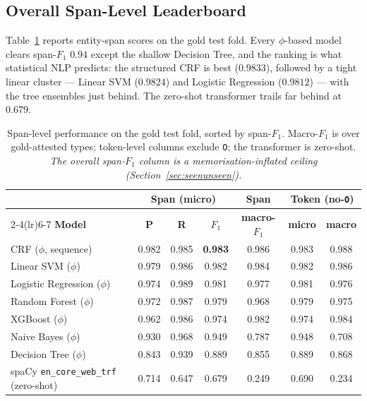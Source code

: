 \documentclass[conference]{IEEEtran}
\begin{document}
\subsection{Overall Span-Level Leaderboard}
\label{sec:overall}

Table~\ref{tab:leaderboard} reports entity-span scores on the gold test fold. Every $\phi$-based model clears span-$F_1$ $0.94$ except the shallow Decision Tree, and the ranking is what statistical NLP predicts: the structured CRF is best ($0.9833$), followed by a tight linear cluster --- Linear SVM ($0.9824$) and Logistic Regression ($0.9812$) --- with the tree ensembles just behind. The zero-shot transformer trails far behind at $0.679$.

\begin{table}[!t]
\centering
\caption{Span-level performance on the gold test fold, sorted by span-$F_1$. Macro-$F_1$ is over gold-attested types; token-level columns exclude \texttt{O}; the transformer is zero-shot. \emph{The overall span-$F_1$ column is a memorisation-inflated ceiling (Section~\ref{sec:seenunseen}).}}
\label{tab:leaderboard}
\small
\begin{tabular}{@{}l ccc c cc@{}}
\toprule
& \multicolumn{3}{c}{\textbf{Span (micro)}} & \textbf{Span} & \multicolumn{2}{c}{\textbf{Token (no-\texttt{O})}} \\
\cmidrule(lr){2-4}\cmidrule(lr){6-7}
\textbf{Model} & \textbf{P} & \textbf{R} & \textbf{$F_1$} & \textbf{macro-$F_1$} & \textbf{micro} & \textbf{macro} \\
\midrule
CRF ($\phi$, sequence)          & 0.982 & 0.985 & \textbf{0.983} & 0.986 & 0.983 & 0.988 \\
Linear SVM ($\phi$)             & 0.979 & 0.986 & 0.982 & 0.984 & 0.982 & 0.986 \\
Logistic Regression ($\phi$)    & 0.974 & 0.989 & 0.981 & 0.977 & 0.981 & 0.976 \\
Random Forest ($\phi$)          & 0.972 & 0.987 & 0.979 & 0.968 & 0.979 & 0.975 \\
XGBoost ($\phi$)                & 0.962 & 0.986 & 0.974 & 0.982 & 0.974 & 0.984 \\
Naive Bayes ($\phi$)            & 0.930 & 0.968 & 0.949 & 0.787 & 0.948 & 0.708 \\
Decision Tree ($\phi$)          & 0.843 & 0.939 & 0.889 & 0.855 & 0.889 & 0.868 \\
\midrule
spaCy \texttt{en\_core\_web\_trf} (zero-shot) & 0.714 & 0.647 & 0.679 & 0.249 & 0.690 & 0.234 \\
\bottomrule
\end{tabular}
\end{table}
\end{document}
